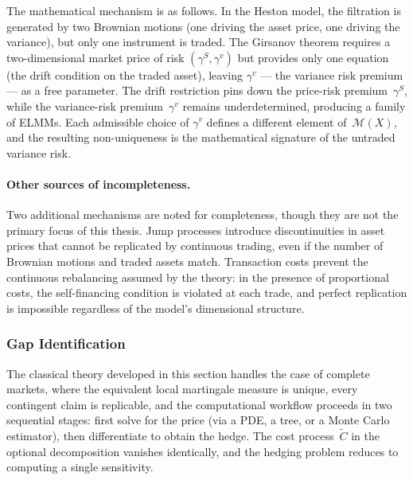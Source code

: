 The mathematical mechanism is as follows.  In the Heston model, the
filtration is generated by two Brownian motions (one driving the asset
price, one driving the variance), but only one instrument is traded.  The
Girsanov theorem requires a two-dimensional market price of risk
$(\gamma^S, \gamma^v)$ but provides only one equation (the drift
condition on the traded asset), leaving $\gamma^v$ --- the variance risk
premium --- as a free parameter.  The drift restriction pins down the
price-risk premium~$\gamma^S$, while the variance-risk
premium~$\gamma^v$ remains underdetermined, producing a family of ELMMs.
Each admissible choice of $\gamma^v$
defines a different element of~$\mathcal{M}(X)$, and the resulting
non-uniqueness is the mathematical signature of the untraded variance
risk.

\paragraph{Other sources of incompleteness.}
Two additional mechanisms are noted for completeness, though they are not
the primary focus of this thesis.  Jump processes
\citep{Merton1976} introduce discontinuities in asset prices that cannot
be replicated by continuous trading, even if the number of Brownian
motions and traded assets match.  Transaction costs
\citep{LelandReplication1985} prevent the continuous rebalancing assumed
by the theory: in the presence of proportional costs, the
self-financing condition is violated at each trade, and perfect
replication is impossible regardless of the model's dimensional structure.

\subsubsection{Gap Identification}
\label{sssec:gap_identification}

The classical theory developed in this section handles the case of
complete markets, where the equivalent local martingale measure is unique,
every contingent claim is replicable, and the computational workflow
proceeds in two sequential stages: first solve for the price (via a PDE,
a tree, or a Monte Carlo estimator), then differentiate to obtain the
hedge.  The cost process~$\tilde{C}$ in the optional decomposition
vanishes identically, and the hedging problem reduces to computing a
single sensitivity.

